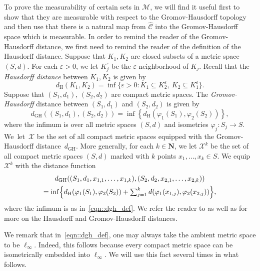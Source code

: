 \documentclass[JEP,XML,SOM,Unicode]{cedram}
\let\mathcal\mathscr
\let\epsilon\varepsilon
\theoremstyle{plain}
\numberwithin{theorem}{section}
\theoremstyle{definition}
\newcommand\mmspace{{\mathcal M}}
\newcommand{\compactmatrix}{\mathcal C}
\newcommand{\N}{\mathbf{N}}
\newcommand{\gh}{{\mathcal X}}
\newcommand{\dgh}{d_{\mathrm {GH}}}
\renewcommand{\dh}{d_{\mathrm{H}}}
\let\wh\widehat
\begin{document}
To prove the measurability of certain sets in $\mmspace$, we will find it useful first to show that they are measurable with respect to the Gromov-Hausdorff topology and then use that there is a natural map from $\wh{\compactmatrix}$ into the Gromov-Hausdorff space which is measurable. In order to remind the reader of the Gromov-Hausdorff distance, we first need to remind the reader of the definition of the Hausdorff distance. Suppose that $K_1,K_2$ are closed subsets of a metric space $(S,d)$. For each $\epsilon > 0$, we let $K_j^\epsilon$ be the $\epsilon$-neighborhood of $K_j$. Recall that the \emph{Hausdorff distance} between $K_1,K_2$ is given by
\begin{equation}
\label{eqn::h_def}
\dh(K_1,K_2) = \inf\{ \epsilon >0 : K_1 \subseteq K_2^\epsilon,\ K_2 \subseteq K_1^\epsilon\}.
\end{equation}
Suppose that $(S_1,d_1)$, $(S_2,d_2)$ are compact metric spaces. The \emph{Gromov-Hausdorff} distance between $(S_1,d_1)$ and $(S_2,d_2)$ is given by
\begin{equation}
\label{eqn::dgh_def}
\dgh((S_1,d_1),(S_2,d_2)) = \inf\left\{ \dh(\varphi_1(S_1),\varphi_2(S_2)) \right\},
\end{equation}
where the infimum is over all metric spaces $(S,d)$ and isometries $\varphi_j \colon S_j \to S$. We~let~$\gh$ be the set of all compact metric spaces equipped with the Gromov-Hausdorff distance~$\dgh$. More generally, for each $k \in \N$, we let $\gh^k$ be the set of all compact metric spaces $(S,d)$ marked with $k$ points $x_1,\ldots,x_k \in S$. We equip $\gh^k$ with the distance function
\begin{multline}
\label{eqn::dghk_def}
\dgh((S_1,d_1,x_{1,1},\ldots,x_{1,k}),(S_2,d_2,x_{2,1},\ldots,x_{2,k}))\\
=\textstyle \inf\Bigl\{ \dh(\varphi_1(S_1),\varphi_2(S_2)) + \sum_{j=1}^k d(\varphi_1(x_{1,j}),\varphi_2(x_{2,j})) \Bigr\},
\end{multline}
where the infimum is as in~\eqref{eqn::dgh_def}. We refer the reader to \cite[Chap.\,27]{villanibook} as well as \cite[Chap.\,7]{courseinmetricgeometry} for more on the Hausdorff and Gromov-Hausdorff distances.

We remark that in~\eqref{eqn::dgh_def}, one may always take the ambient metric space to be $\ell_\infty$. Indeed, this follows because every compact metric space can be isometrically embedded into $\ell_\infty$. We will use this fact several times in what follows.
\end{document}
